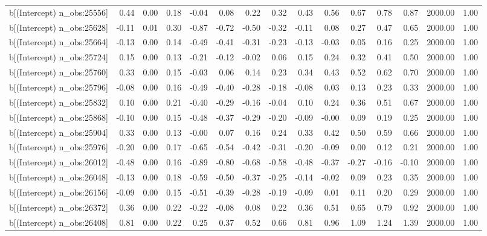 \begin{table}[ht]
\begin{tabular}{rrrrrrrrrrrrrrr}
  b[(Intercept) n\_obs:25556] & 0.44 & 0.00 & 0.18 & -0.04 & 0.08 & 0.22 & 0.32 & 0.43 & 0.56 & 0.67 & 0.78 & 0.87 & 2000.00 & 1.00 \\ 
  b[(Intercept) n\_obs:25628] & -0.11 & 0.01 & 0.30 & -0.87 & -0.72 & -0.50 & -0.32 & -0.11 & 0.08 & 0.27 & 0.47 & 0.65 & 2000.00 & 1.00 \\ 
  b[(Intercept) n\_obs:25664] & -0.13 & 0.00 & 0.14 & -0.49 & -0.41 & -0.31 & -0.23 & -0.13 & -0.03 & 0.05 & 0.16 & 0.25 & 2000.00 & 1.00 \\ 
  b[(Intercept) n\_obs:25724] & 0.15 & 0.00 & 0.13 & -0.21 & -0.12 & -0.02 & 0.06 & 0.15 & 0.24 & 0.32 & 0.41 & 0.50 & 2000.00 & 1.00 \\ 
  b[(Intercept) n\_obs:25760] & 0.33 & 0.00 & 0.15 & -0.03 & 0.06 & 0.14 & 0.23 & 0.34 & 0.43 & 0.52 & 0.62 & 0.70 & 2000.00 & 1.00 \\ 
  b[(Intercept) n\_obs:25796] & -0.08 & 0.00 & 0.16 & -0.49 & -0.40 & -0.28 & -0.18 & -0.08 & 0.03 & 0.13 & 0.23 & 0.33 & 2000.00 & 1.00 \\ 
  b[(Intercept) n\_obs:25832] & 0.10 & 0.00 & 0.21 & -0.40 & -0.29 & -0.16 & -0.04 & 0.10 & 0.24 & 0.36 & 0.51 & 0.67 & 2000.00 & 1.00 \\ 
  b[(Intercept) n\_obs:25868] & -0.10 & 0.00 & 0.15 & -0.48 & -0.37 & -0.29 & -0.20 & -0.09 & -0.00 & 0.09 & 0.19 & 0.25 & 2000.00 & 1.00 \\ 
  b[(Intercept) n\_obs:25904] & 0.33 & 0.00 & 0.13 & -0.00 & 0.07 & 0.16 & 0.24 & 0.33 & 0.42 & 0.50 & 0.59 & 0.66 & 2000.00 & 1.00 \\ 
  b[(Intercept) n\_obs:25976] & -0.20 & 0.00 & 0.17 & -0.65 & -0.54 & -0.42 & -0.31 & -0.20 & -0.09 & 0.00 & 0.12 & 0.21 & 2000.00 & 1.00 \\ 
  b[(Intercept) n\_obs:26012] & -0.48 & 0.00 & 0.16 & -0.89 & -0.80 & -0.68 & -0.58 & -0.48 & -0.37 & -0.27 & -0.16 & -0.10 & 2000.00 & 1.00 \\ 
  b[(Intercept) n\_obs:26048] & -0.13 & 0.00 & 0.18 & -0.59 & -0.50 & -0.37 & -0.25 & -0.14 & -0.02 & 0.09 & 0.23 & 0.35 & 2000.00 & 1.00 \\ 
  b[(Intercept) n\_obs:26156] & -0.09 & 0.00 & 0.15 & -0.51 & -0.39 & -0.28 & -0.19 & -0.09 & 0.01 & 0.11 & 0.20 & 0.29 & 2000.00 & 1.00 \\ 
  b[(Intercept) n\_obs:26372] & 0.36 & 0.00 & 0.22 & -0.22 & -0.08 & 0.08 & 0.22 & 0.36 & 0.51 & 0.65 & 0.79 & 0.92 & 2000.00 & 1.00 \\ 
  b[(Intercept) n\_obs:26408] & 0.81 & 0.00 & 0.22 & 0.25 & 0.37 & 0.52 & 0.66 & 0.81 & 0.96 & 1.09 & 1.24 & 1.39 & 2000.00 & 1.00 \\ 

\end{tabular}
\end{table}
